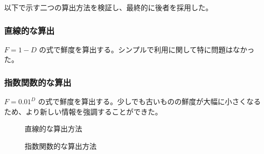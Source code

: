 以下で示す二つの算出方法を検証し、最終的に後者を採用した。

\subsubsection{直線的な算出}

$ F = 1 - D $ の式で鮮度を算出する。シンプルで利用に関して特に問題はなかった。

\subsubsection{指数関数的な算出}

$ F =  0.01 ^ D$ の式で鮮度を算出する。少しでも古いものの鮮度が大幅に小さくなるため、より新しい情報を強調することができた。

\begin{figure}[htbp]
  \begin{minipage}{0.5\hsize}
    \begin{center}
    \end{center}
    \caption{直線的な算出方法}
  \end{minipage}
  \begin{minipage}{0.5\hsize}
    \begin{center}
    \end{center}
    \caption{指数関数的な算出方法}
  \end{minipage}
\end{figure}
